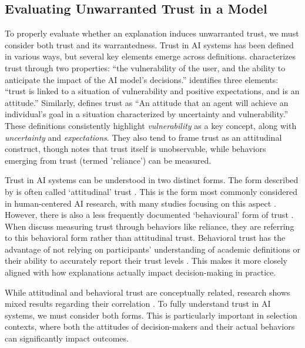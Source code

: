 \subsection{Evaluating Unwarranted Trust in a Model}
To properly evaluate whether an explanation induces unwarranted trust, we must consider both trust and its warrantedness. Trust in AI systems has been defined in various ways, but several key elements emerge across definitions. \textcite{jacovi_formalizing_2021} characterizes trust through two properties: ``the vulnerability of the user, and the ability to anticipate the impact of the AI model's decisions.'' \textcite{vereschak_how_2021} identifies three elements: ``trust is linked to a situation of vulnerability and positive expectations, and is an attitude.'' Similarly, \textcite{lee_trust_2004} defines trust as ``An attitude that an agent will achieve an individual's goal in a situation characterized by uncertainty and vulnerability.'' These definitions consistently highlight \emph{vulnerability} as a key concept, along with \emph{uncertainty} and \emph{expectations}. They also tend to frame trust as an attitudinal construct, though \textcite{vereschak_how_2021} notes that trust itself is unobservable, while behaviors emerging from trust (termed 'reliance') can be measured.

Trust in AI systems can be understood in two distinct forms. The form described by \textcite{vereschak_how_2021} is often called `attitudinal' trust \cite{crites_measuring_1994}. This is the form most commonly considered in human-centered AI research, with many studies focusing on this aspect \cite{vereschak_how_2021, ford_play_2020, bansal_does_2021, yin_understanding_2019}. However, there is also a less frequently documented `behavioural' form of trust \cite{crites_measuring_1994}. When \textcite{jacovi_formalizing_2021,lee_trust_2004} discuss measuring trust through behaviors like reliance, they are referring to this behavioral form rather than attitudinal trust. Behavioral trust has the advantage of not relying on participants' understanding of academic definitions or their ability to accurately report their trust levels \cite{jacovi_formalizing_2021}. This makes it more closely aligned with how explanations actually impact decision-making in practice.

While attitudinal and behavioral trust are conceptually related, research shows mixed results regarding their correlation \cite{ahmed_relationship_2009, kim_relation_2018}. To fully understand trust in AI systems, we must consider both forms. This is particularly important in selection contexts, where both the attitudes of decision-makers and their actual behaviors can significantly impact outcomes.

